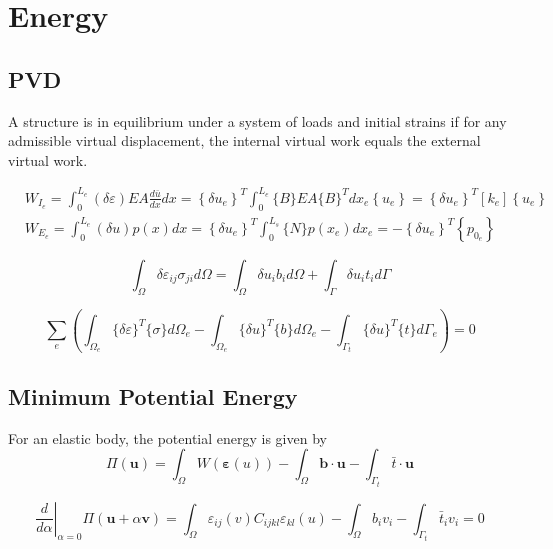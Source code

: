 \hypertarget{energy}{%
\section{Energy}\label{energy}}

\hypertarget{pvd}{%
\subsection{PVD}\label{pvd}}

A structure is in equilibrium under a system of loads and initial
strains if for any admissible virtual displacement, the internal virtual
work equals the external virtual work.

\[\begin{aligned}
&W_{I_{e}}=\int_{0}^{L_{e}}(\delta \varepsilon) E A \frac{d \bar{u}}{d x} d x=\left\{\delta u_{e}\right\}^{T} \int_{0}^{L_{e}}\{B\} E A\{B\}^{T} d x_{e}\left\{u_{e}\right\}=\left\{\delta u_{e}\right\}^{T}\left[k_{e}\right]\left\{u_{e}\right\}\\
&W_{E_{e}}=\int_{0}^{L_{e}}(\delta u) p(x) d x=\left\{\delta u_{e}\right\}^{T} \int_{0}^{L_{s}}\{N\} p\left(x_{e}\right) d x_{e}=-\left\{\delta u_{e}\right\}^{T}\left\{p_{0_{e}}\right\}
\end{aligned}\]

\[\int_{\Omega} \delta \varepsilon_{i j} \sigma_{j i} d \Omega=\int_{\Omega} \delta u_{i} b_{i} d \Omega+\int_{\Gamma} \delta u_{i} t_{i} d \Gamma\]

\[\sum_{e}\left(\int_{\Omega_{e}}\{\delta \varepsilon\}^{T}\{\sigma\} d \Omega_{e}-\int_{\Omega_{e}}\{\delta u\}^{T}\{b\} d \Omega_{e}-\int_{\Gamma_{t}}\{\delta u\}^{T}\{t\} d \Gamma_{e}\right)=0\]

\hypertarget{minimum-potential-energy}{%
\subsection{Minimum Potential Energy}\label{minimum-potential-energy}}

For an elastic body, the potential energy is given by \[
\Pi(\boldsymbol{u})=\int_{\Omega} W(\boldsymbol{\varepsilon}(u))-\int_{\Omega} \boldsymbol{b} \cdot \boldsymbol{u}-\int_{\Gamma_{t}} \bar{t} \cdot \boldsymbol{u}
\]

\[\left.\frac{d}{d \alpha}\right|_{\alpha=0} \Pi(\boldsymbol{u}+\alpha \boldsymbol{v})=\int_{\Omega} \varepsilon_{i j}(v) C_{i j k l} \varepsilon_{k l}(u)-\int_{\Omega} b_{i} v_{i}-\int_{\Gamma_{t}} \bar{t}_{i} v_{i}=0\]
